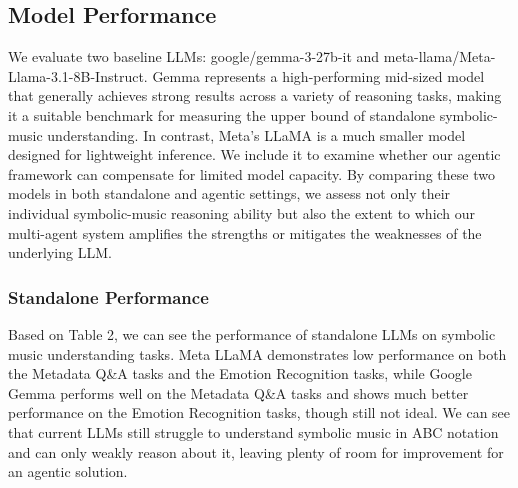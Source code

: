 \documentclass[sigconf]{acmart}
\begin{document}
\subsection{Model Performance}
We evaluate two baseline LLMs: google/gemma-3-27b-it and meta-llama/Meta-Llama-3.1-8B-Instruct.
Gemma represents a high-performing mid-sized model that generally achieves strong results across a variety of reasoning tasks, making it a suitable benchmark for measuring the upper bound of standalone symbolic-music understanding. In contrast, Meta's LLaMA is a much smaller model designed for lightweight inference. We include it to examine whether our agentic framework can compensate for limited model capacity. By comparing these two models in both standalone and agentic settings, we assess not only their individual symbolic-music reasoning ability but also the extent to which our multi-agent system amplifies the strengths or mitigates the weaknesses of the underlying LLM.

\subsubsection{Standalone Performance}
Based on Table 2, we can see the performance of standalone LLMs on symbolic music understanding tasks. Meta LLaMA demonstrates low performance on both the Metadata Q&A tasks and the Emotion Recognition tasks, while Google Gemma performs well on the Metadata Q&A tasks and shows much better performance on the Emotion Recognition tasks, though still not ideal. We can see that current LLMs still struggle to understand symbolic music in ABC notation and can only weakly reason about it, leaving plenty of room for improvement for an agentic solution.
\end{document}
